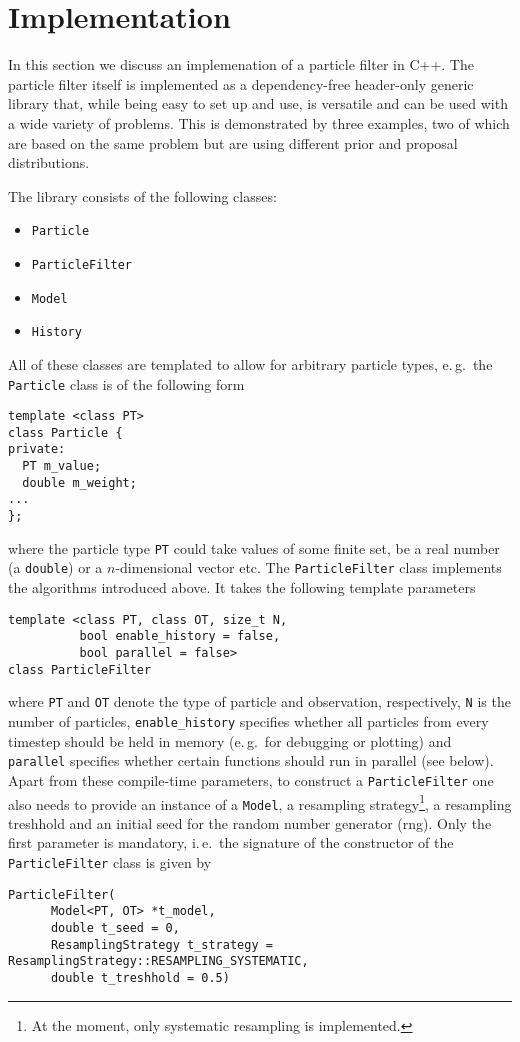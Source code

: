 \section*{Implementation}
In this section we discuss an implemenation of a particle filter in
C++. The particle filter itself is implemented as a dependency-free
header-only generic library that, while being easy to set up and use,
is versatile and can be used with a wide variety of problems. This is
demonstrated by three examples, two of which are based on the same
problem but are using different prior and proposal distributions.

The library consists of the following classes:
\begin{itemize}
\item \texttt{Particle}
\item \texttt{ParticleFilter}
\item \texttt{Model}
\item \texttt{History}
\end{itemize}
All of these classes are templated to allow for arbitrary particle
types, e.\,g.\ the \texttt{Particle} class is of the following form
\begin{verbatim}
template <class PT> 
class Particle {
private:
  PT m_value;
  double m_weight;
...
}; 
\end{verbatim}
where the particle type \texttt{PT} could take values of some finite
set, be a real number (\ie a \texttt{double}) or a $n$-dimensional
vector etc. The \texttt{ParticleFilter} class implements the
algorithms introduced above. It takes the following template
parameters
\begin{verbatim}
template <class PT, class OT, size_t N, 
          bool enable_history = false,
          bool parallel = false>
class ParticleFilter
\end{verbatim}
where \texttt{PT} and \texttt{OT} denote the type of particle and
observation, respectively, \texttt{N} is the number of particles,
\texttt{enable\_history} specifies whether all particles from every
timestep should be held in memory (e.\,g.\ for debugging or plotting)
and \texttt{parallel} specifies whether certain functions should run
in parallel (see below). Apart from these compile-time parameters, to
construct a \texttt{ParticleFilter} one also needs to provide an
instance of a \texttt{Model}, a resampling strategy\footnote{At the
  moment, only systematic resampling is implemented.}, a resampling
treshhold and an initial seed for the random number generator
(rng). Only the first parameter is mandatory, i.\,e.\ the signature of
the constructor of the \texttt{ParticleFilter} class is given by
\begin{verbatim}
ParticleFilter(
      Model<PT, OT> *t_model,
      double t_seed = 0,
      ResamplingStrategy t_strategy = ResamplingStrategy::RESAMPLING_SYSTEMATIC,
      double t_treshhold = 0.5)
\end{verbatim}

